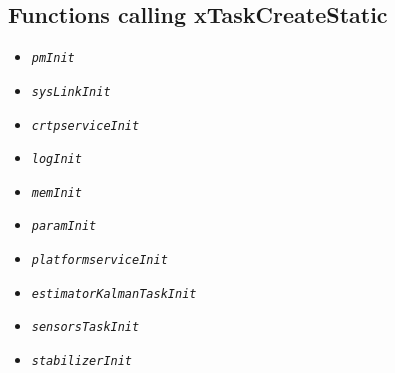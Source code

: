 \documentclass[10pt, a4paper]{article}
\newcommand{\textFunc}[1]{\texttt{\textit{#1}}}
\begin{document}
\subsection{Functions calling xTaskCreateStatic}
\label{a:xTaskStatic}
\begin{multicols}{2}
    \begin{itemize}
        \item \textFunc{pmInit}
        \item \textFunc{sysLinkInit}
        \item \textFunc{crtpserviceInit}
        \item \textFunc{logInit}
        \item \textFunc{memInit}
    \end{itemize}
\columnbreak
    \begin{itemize}
        \item \textFunc{paramInit}
        \item \textFunc{platformserviceInit}
        \item \textFunc{estimatorKalmanTaskInit}
        \item \textFunc{sensorsTaskInit}
        \item \textFunc{stabilizerInit}
    \end{itemize}
\end{multicols}
\end{document}
